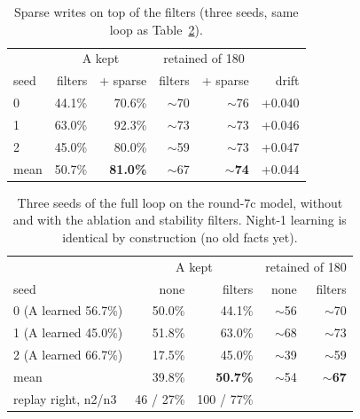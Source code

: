 \documentclass[11pt]{article}
\begin{document}
\begin{table}[t]\centering\small
\caption{Sparse writes on top of the filters (three seeds, same loop as
Table~\ref{tab:seeds}).}\label{tab:sparse}
\begin{tabular}{lrrrrr}\toprule
& \multicolumn{2}{c}{A kept} & \multicolumn{2}{c}{retained of 180} & \\
seed & filters & + sparse & filters & + sparse & drift\\\midrule
0 & 44.1\% & 70.6\% & $\sim$70 & $\sim$76 & +0.040\\
1 & 63.0\% & 92.3\% & $\sim$73 & $\sim$73 & +0.046\\
2 & 45.0\% & 80.0\% & $\sim$59 & $\sim$73 & +0.047\\\midrule
mean & 50.7\% & \textbf{81.0\%} & $\sim$67 & $\sim$\textbf{74} & +0.044\\\bottomrule
\end{tabular}\end{table}

\begin{table}[t]\centering\small
\caption{Three seeds of the full loop on the round-7c model, without and with
the ablation and stability filters. Night-1 learning is identical by
construction (no old facts yet).}\label{tab:seeds}
\begin{tabular}{lrrrr}\toprule
& \multicolumn{2}{c}{A kept} & \multicolumn{2}{c}{retained of 180}\\
seed & none & filters & none & filters\\\midrule
0 (A learned 56.7\%) & 50.0\% & 44.1\% & $\sim$56 & $\sim$70\\
1 (A learned 45.0\%) & 51.8\% & 63.0\% & $\sim$68 & $\sim$73\\
2 (A learned 66.7\%) & 17.5\% & 45.0\% & $\sim$39 & $\sim$59\\\midrule
mean & 39.8\% & \textbf{50.7\%} & $\sim$54 & $\sim$\textbf{67}\\
replay right, n2/n3 & 46 / 27\% & 100 / 77\% & &\\\bottomrule
\end{tabular}\end{table}
\end{document}
